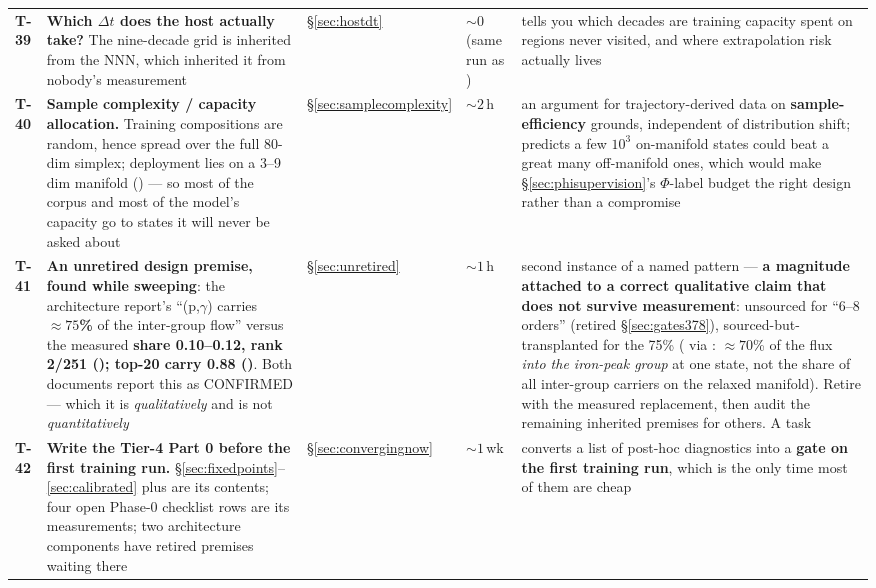 \begin{longtable}{@{}L{1.0cm} L{6.0cm} L{2.2cm} L{1.7cm} L{4.7cm}@{}}
\textbf{T-39} &
\textbf{Which $\Delta t$ does the host actually take?} The nine-decade grid
is inherited from the NNN, which inherited it from nobody's measurement &
\S\ref{sec:hostdt} & ${\sim}0$ (same run as ) &
tells you which decades are training capacity spent on regions never
visited, and where extrapolation risk actually lives \\

\textbf{T-40} &
\textbf{Sample complexity / capacity allocation.} Training compositions are
random, hence spread over the full 80-dim simplex; deployment lies on a 3--9
dim manifold () --- so most of the corpus and most of the
model's capacity go to states it will never be asked about &
\S\ref{sec:samplecomplexity} & ${\sim}2$\,h &
an argument for trajectory-derived data on \textbf{sample-efficiency}
grounds, independent of distribution shift; predicts a few $10^{3}$
on-manifold states could beat a great many off-manifold ones, which would
make \S\ref{sec:phisupervision}'s $\Phi$-label budget the right design rather
than a compromise \\

\textbf{T-41} &
\warnglyph{} \textbf{An unretired design premise, found while sweeping}: the
architecture report's ``(p,$\gamma$) carries
\textbf{${\approx}75$\%} of the inter-group flow'' versus the measured
\textbf{share 0.10--0.12, rank 2/251 (); top-20 carry 0.88
()}. Both documents report this as CONFIRMED --- which it is
\emph{qualitatively} and is not \emph{quantitatively} &
\S\ref{sec:unretired} & ${\sim}1$\,h &
second instance of a named pattern --- \textbf{a magnitude attached to a
correct qualitative claim that does not survive measurement}: unsourced for
``6--8 orders'' (retired \S\ref{sec:gates378}), sourced-but-transplanted for
the 75\% (\citealt{woosley1973} via \citealt{hix1996}: ${\approx}70$\% of
the flux \emph{into the iron-peak group} at one state, not the share of all
inter-group carriers on the relaxed manifold). Retire with the measured
replacement, then audit the remaining inherited premises for others. A
 task \\

\textbf{T-42} &
\textbf{Write the Tier-4 Part 0 before the first training run.}
\S\ref{sec:fixedpoints}--\ref{sec:calibrated} plus
 are its contents; four open Phase-0
checklist rows are its measurements; two architecture components have
retired premises waiting there & \S\ref{sec:convergingnow} & ${\sim}1$\,wk &
converts a list of post-hoc diagnostics into a \textbf{gate on the first
training run}, which is the only time most of them are cheap \\
\end{longtable}
\endgroup

